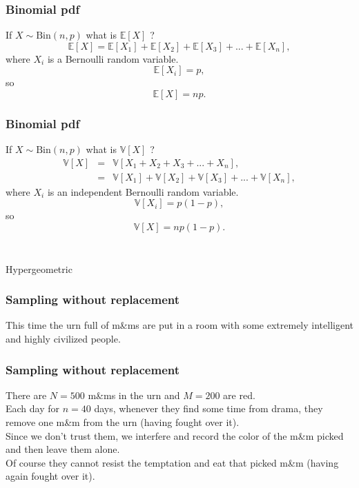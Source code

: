 \begin{frame}[fragile]\frametitle{Binomial pdf}

If $X \sim \mbox{Bin}(n,p)$ what is $\mathbb E[X]$ ?  
$$\mathbb E[X] = \mathbb E[X_1]+\mathbb E[X_2]+\mathbb E[X_3]+ ... + \mathbb E[X_n],$$
where $X_i$ is a Bernoulli random variable. \\ 
$$\mathbb E[X_i] = p,$$
so
$$\mathbb E[X] = np.$$ 

\end{frame}



\begin{frame}[fragile]\frametitle{Binomial pdf}

If $X \sim \mbox{Bin}(n,p)$ what is $\mathbb V[X]$ ?  
\begin{eqnarray*}
\mathbb V[X]& =& \mathbb V[X_1+X_2+X_3+ ... +X_n],\\
      &= &\mathbb V[X_1]+\mathbb V[X_2]+\mathbb V[X_3]+ ... + \mathbb V[X_n],
\end{eqnarray*}
where $X_i$ is an independent Bernoulli random variable. \\ 
$$\mathbb V[X_i] = p(1-p),$$
so
$$\mathbb V[X] = np(1-p).$$ \\ 

\end{frame}


\begin{frame}[fragile]\frametitle{}
\begin{center}
{\Large Hypergeometric}

\end{center}
\end{frame}



\begin{frame}[fragile]\frametitle{Sampling without replacement}

This time the urn full of m\&ms are put in a room with some extremely intelligent and highly civilized people.

\center{\texttt{[image: bb]} }

\end{frame}


\begin{frame}[fragile]\frametitle{Sampling without replacement}

There are $N=500$ m\&ms in the urn and $M=200$ are red. \\ 
Each day for $n=40$ days, whenever they find some time from drama, they remove one m\&m from
the urn (having fought over it). \\ 
Since we don't trust them, we interfere and record the color of the m\&m picked and then leave them alone. \\ 
Of course they cannot resist the temptation and eat that picked m\&m (having again fought over it).

\end{frame}


